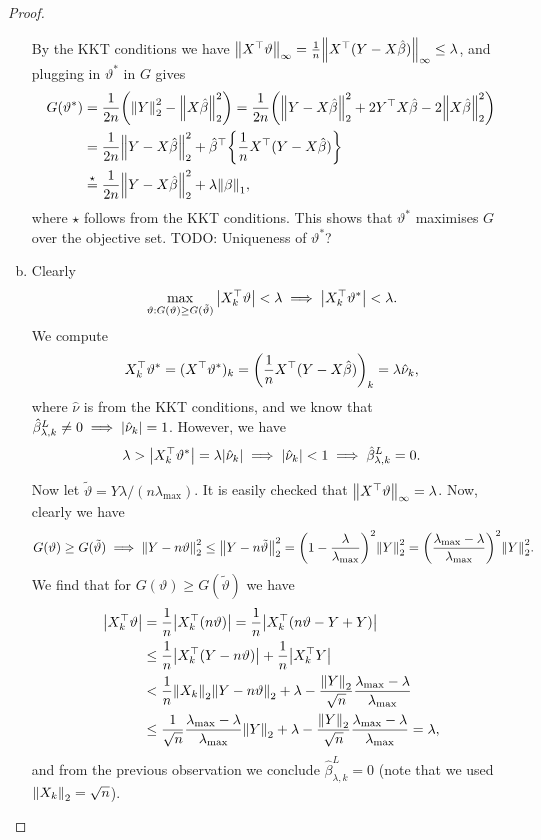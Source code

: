 \documentclass{article}
\theoremstyle{plain}
\theoremstyle{remark}
\renewcommand{\theta}{\vartheta}
\newcommand{\Rm}{\mathrm}
\newcommand{\T}{^\top} %
\newcommand\TODO{{\color{red} TODO: }}
\begin{document}
\begin{proof}
\begin{enumerate}[(a)]
By the KKT conditions we have $\norm{X\T\theta}_\infty = \frac1n\norm{X\T(Y - X\hat\beta)}_\infty \leq \lambda$, and plugging in $\theta^*$ in $G$ gives
\begin{align*}
	G(\theta^*) &= \frac1{2n} \qty(\norm{Y}_2^2 - \norm{X\hat\beta}_2^2) = \frac1{2n} \qty(\norm{Y - X\hat\beta}_2^2 + 2 Y\T X \hat\beta - 2 \norm{X\hat\beta}_2^2) \\
	&= \frac1{2n}\norm{Y - X\hat\beta}_2^2 + \hat\beta\T \qty{\frac1n X\T(Y - X\hat\beta)} \\
	&\overset\star= \frac1{2n} \norm{Y - X\hat\beta}_2^2 + \lambda \norm{\beta}_1,
\end{align*}
where $\star$ follows from the KKT conditions. This shows that $\theta^*$ maximises $G$ over the objective set.  \TODO Uniqueness of $\theta^*$? 

\item Clearly
\[
\max_{\theta : G(\theta) \geq G(\tilde\theta)} \abs{X_k\T \theta} < \lambda \implies \abs{X_k\T \theta^*} < \lambda. 
\]
We compute
\[
X_k\T \theta^* = (X\T \theta^*)_k = \qty(\frac 1n X\T (Y - X\hat\beta))_k = \lambda \hat\nu_k, 
\]
where $\hat\nu$ is from the KKT conditions, and we know that $\hat\beta_{\lambda, k}^L \neq 0 \implies \abs{\hat \nu_k} = 1$.
However, we have
\[
\lambda > \abs{X_k\T \theta^*} = \lambda \abs{\hat\nu_k} \implies \abs{\hat\nu_k} < 1 \implies \hat\beta_{\lambda, k}^L = 0. 
\]

Now let $\tilde\theta = Y\lambda/ (n\lambda_\Rm{max})$. It is easily checked that $\norm{X\T\theta}_\infty = \lambda$. Now, clearly we have 
\[
G(\theta) \geq G(\tilde\theta) \implies  \norm{Y- n\theta}_2^2 \leq \norm{Y - n \tilde\theta}_2^2 = \qty(1 - \frac\lambda{\lambda_\Rm{max}})^2 \norm{Y}_2^2 = \qty(\frac{\lambda_\Rm{max} - \lambda}{\lambda_\Rm{max}})^2 \norm{Y}_2^2.
\]
We find that for $G(\theta) \geq G(\tilde\theta)$ we have
\begin{align*}
	\abs{X_k\T\theta} &= \frac1n\abs{X_k\T (n\theta)} = \frac1n \abs{X_k\T (n\theta - Y + Y)} \\
	&\leq \frac1n \abs{X_k\T (Y - n\theta)} + \frac1n \abs{X_k\T Y} \\
	&< \frac1n \norm{X_k}_2 \norm{Y - n\theta}_2 + \lambda - \frac{\norm{Y}_2}{\sqrt n} \frac{\lambda_\Rm{max} - \lambda}{\lambda_\Rm{max}} \\
	&\leq \frac{1}{\sqrt n} \frac{\lambda_\Rm{max} - \lambda}{\lambda_\Rm{max}} \norm{Y}_2 + \lambda - \frac{\norm{Y}_2}{\sqrt n} \frac{\lambda_\Rm{max} - \lambda}{\lambda_\Rm{max}} = \lambda,
\end{align*}
and from the previous observation we conclude $\hat\beta^L_{\lambda, k} = 0$ (note that we used $\norm{X_k}_2 = \sqrt n$). 
\end{enumerate}
\end{proof}
\end{document}
